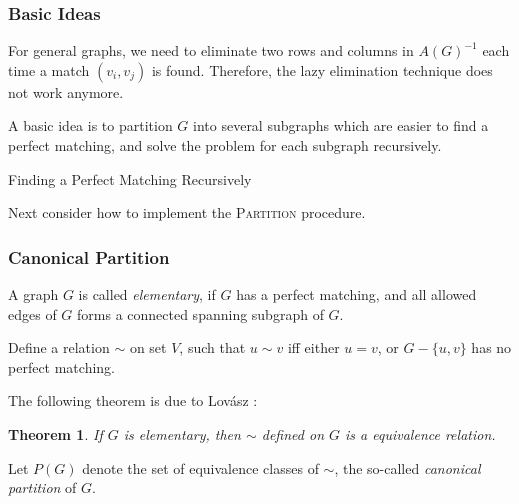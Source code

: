 \documentclass{article}
\newtheorem{theorem}{Theorem}
\begin{document}
			\subsubsection{Basic Ideas}

				For general graphs, we need to eliminate two rows and columns in $A(G)^{-1}$ each time a match $(v_i, v_j)$ is found. Therefore, the lazy elimination technique does not work anymore.

				A basic idea is to partition $G$ into several subgraphs which are easier to find a perfect matching, and solve the problem for each subgraph recursively.

				\begin{algorithm}
					\caption{Finding a Perfect Matching Recursively}

					\begin{algorithmic}[1]
							\Else
							\EndIf
						\EndFunction
					\end{algorithmic}
				\end{algorithm}

				Next consider how to implement the \textsc{Partition} procedure.
			
			\subsubsection{Canonical Partition}
				
				A graph $G$ is called \emph{elementary}, if $G$ has a perfect matching, and all allowed edges of $G$ forms a connected spanning subgraph of $G$.

				Define a relation $\sim$ on set $V$, such that $u \sim v$ iff either $u = v$, or $G - \{u, v\}$ has no perfect matching.
				
				The following theorem is due to Lov\'asz  :

				\begin{theorem}
					If $G$ is elementary, then $\sim$ defined on $G$ is a equivalence relation.
				\end{theorem}

				Let $P(G)$ denote the set of equivalence classes of $\sim$, the so-called \emph{canonical partition} of $G$.
\end{document}
